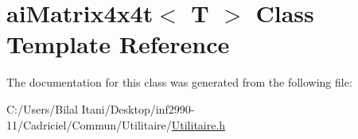 \hypertarget{classai_matrix4x4t}{}\section{ai\+Matrix4x4t$<$ T $>$ Class Template Reference}
\label{classai_matrix4x4t}


The documentation for this class was generated from the following file\+:\begin{DoxyCompactItemize}
\item 
C\+:/\+Users/\+Bilal Itani/\+Desktop/inf2990-\/11/\+Cadriciel/\+Commun/\+Utilitaire/\hyperlink{_utilitaire_8h}{Utilitaire.\+h}\end{DoxyCompactItemize}
